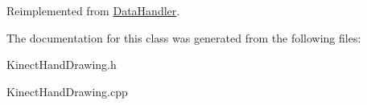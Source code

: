 \-Reimplemented from \hyperlink{classDataHandler_ac0905747d6729d67d838aba050d14e81}{\-Data\-Handler}.



\-The documentation for this class was generated from the following files\-:\begin{DoxyCompactItemize}
\item 
\-Kinect\-Hand\-Drawing.\-h\item 
\-Kinect\-Hand\-Drawing.\-cpp\end{DoxyCompactItemize}
